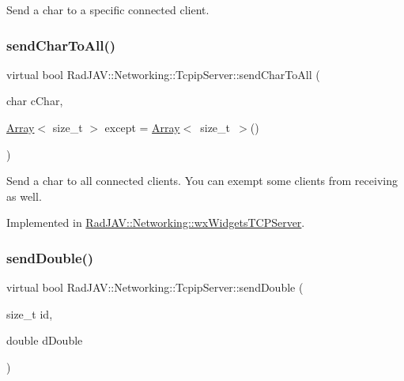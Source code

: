 Send a char to a specific connected client. \mbox{\label{class_rad_j_a_v_1_1_networking_1_1_tcpip_server_aa6299798c9db568bd94f3f616226340a}} 
\subsubsection{\texorpdfstring{send\+Char\+To\+All()}{sendCharToAll()}}
{\footnotesize\ttfamily virtual bool Rad\+J\+A\+V\+::\+Networking\+::\+Tcpip\+Server\+::send\+Char\+To\+All (\begin{DoxyParamCaption}\item[{char}]{c\+Char,  }\item[{\mbox{\hyperlink{class_rad_j_a_v_1_1_array}{Array}}$<$ size\+\_\+t $>$}]{except = {\ttfamily \mbox{\hyperlink{class_rad_j_a_v_1_1_array}{Array}}$<$~size\+\_\+t~$>$()} }\end{DoxyParamCaption})\hspace{0.3cm}{\ttfamily [pure virtual]}}

Send a char to all connected clients. You can exempt some clients from receiving as well. 

Implemented in \mbox{\hyperlink{class_rad_j_a_v_1_1_networking_1_1wx_widgets_t_c_p_server_a4a78814fc536f2c8a932d3fcf8c2c1dd}{Rad\+J\+A\+V\+::\+Networking\+::wx\+Widgets\+T\+C\+P\+Server}}.

\mbox{\label{class_rad_j_a_v_1_1_networking_1_1_tcpip_server_a646d77a978be8abdfbca26903e8c1f62}} 
\subsubsection{\texorpdfstring{send\+Double()}{sendDouble()}}
{\footnotesize\ttfamily virtual bool Rad\+J\+A\+V\+::\+Networking\+::\+Tcpip\+Server\+::send\+Double (\begin{DoxyParamCaption}\item[{size\+\_\+t}]{id,  }\item[{double}]{d\+Double }\end{DoxyParamCaption})\hspace{0.3cm}{\ttfamily [pure virtual]}}

